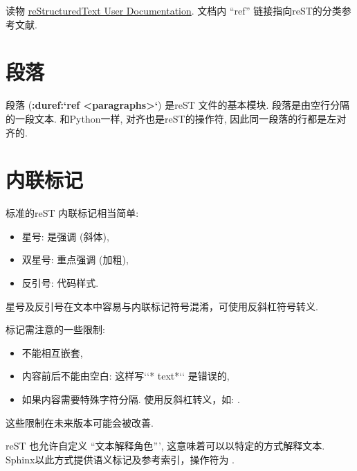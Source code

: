 \documentclass[letterpaper,10pt,english]{sphinxmanual}
\begin{document}


读物 \href{http://docutils.sourceforge.net/rst.html}{reStructuredText User Documentation}.  文档内 ``ref'' 链接指向reST的分类参考文献.




\section{段落}
\label{rest:id1}
段落 ({\color{red}\bfseries{}:duref:{}`ref \textless{}paragraphs\textgreater{}{}`}) 是reST 文件的基本模块.
段落是由空行分隔的一段文本.  和Python一样, 对齐也是reST的操作符, 因此同一段落的行都是左对齐的.


\section{内联标记}
\label{rest:inlinemarkup}\label{rest:id4}
标准的reST 内联标记相当简单:
\begin{itemize}
\item {} 
星号:  是强调 (斜体),

\item {} 
双星号:  重点强调 (加粗),

\item {} 
反引号:  代码样式.

\end{itemize}

星号及反引号在文本中容易与内联标记符号混淆，可使用反斜杠符号转义.

标记需注意的一些限制:
\begin{itemize}
\item {} 
不能相互嵌套,

\item {} 
内容前后不能由空白: 这样写{}`{}`* text*{}`{}` 是错误的,

\item {} 
如果内容需要特殊字符分隔.  使用反斜杠转义，如: .

\end{itemize}

这些限制在未来版本可能会被改善.

reST 也允许自定义 ``文本解释角色''', 这意味着可以以特定的方式解释文本.
Sphinx以此方式提供语义标记及参考索引，操作符为 .
\end{document}
